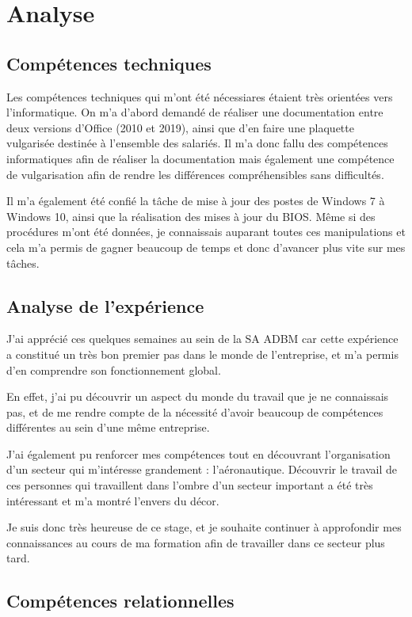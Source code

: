 \chapter{Analyse}


\section{Compétences techniques}

Les compétences techniques qui m'ont été nécessiares étaient très orientées vers l'informatique.
On m'a d'abord demandé de réaliser une documentation entre deux versions d'Office (2010 et 2019), ainsi que d'en faire une plaquette vulgarisée destinée à l'ensemble des salariés.
Il m'a donc fallu des compétences informatiques afin de réaliser la documentation mais également une compétence de vulgarisation afin de rendre les différences compréhensibles sans difficultés.

Il m'a également été confié la tâche de mise à jour des postes de Windows 7 à Windows 10, ainsi que la réalisation des mises à jour du BIOS.
Même si des procédures m'ont été données, je connaissais auparant toutes ces manipulations et cela m'a permis de gagner beaucoup de temps et donc d'avancer plus vite sur mes tâches.

\section{Analyse de l'expérience}

J'ai apprécié ces quelques semaines au sein de la SA ADBM car cette expérience a constitué un très bon premier pas dans le monde de l'entreprise, et m'a permis d'en comprendre son fonctionnement global.

En effet, j'ai pu découvrir un aspect du monde du travail que je ne connaissais pas, et de me rendre compte de la nécessité d'avoir beaucoup de compétences différentes au sein d'une même entreprise.

J'ai également pu renforcer mes compétences tout en découvrant l'organisation d'un secteur qui m'intéresse grandement : l'aéronautique. Découvrir le travail de ces personnes qui travaillent dans l'ombre d'un secteur important a été très intéressant et m'a montré l'envers du décor.

Je suis donc très heureuse de ce stage, et je souhaite continuer à approfondir mes connaissances au cours de ma formation afin de travailler dans ce secteur plus tard.


\section{Compétences relationnelles}

